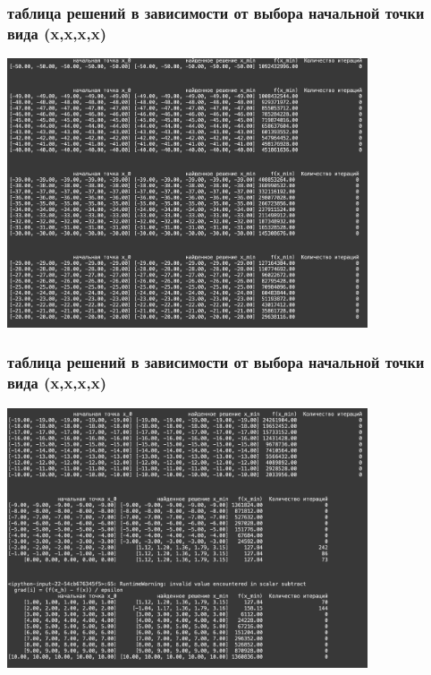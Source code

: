\documentclass[12pt,pdf,hyperref={unicode}]{beamer}
\begin{document}
\begin{frame}
\frametitle{таблица решений в зависимости от выбора начальной точки вида (x,x,x,x)}
\begin{center}
    \includegraphics[width=0.8\textwidth]{xxx1.png}
\end{center}

\end{frame}

\begin{frame}
\frametitle{таблица решений в зависимости от выбора начальной точки вида (x,x,x,x)}
\begin{center}
    \includegraphics[width=0.8\textwidth]{xxx2.png}
\end{center}
\end{frame}
\end{document}
